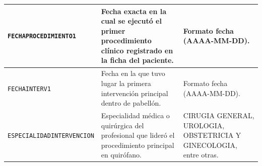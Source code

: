 \begin{table}[htbp]
\begin{tabular}{|l|l|l|}
\parbox[t]{3.8cm}{\texttt{FECHAPROCEDIMIENTO1}} & \parbox[t]{5.4cm}{Fecha exacta en la cual se ejecutó el primer procedimiento clínico registrado en la ficha del paciente.} & \parbox[t]{3.8cm}{Formato fecha (AAAA-MM-DD).} \\ \hline
\parbox[t]{3.8cm}{\texttt{FECHAINTERV1}} & \parbox[t]{5.4cm}{Fecha en la que tuvo lugar la primera intervención principal dentro de pabellón.} & \parbox[t]{3.8cm}{Formato fecha (AAAA-MM-DD).} \\ \hline
\parbox[t]{3.8cm}{\texttt{ESPECIALIDADINTERVENCION}} & \parbox[t]{5.4cm}{Especialidad médica o quirúrgica del profesional que lideró el procedimiento principal en quirófano.} & \parbox[t]{3.8cm}{CIRUGIA GENERAL, UROLOGIA, OBSTETRICIA Y GINECOLOGIA, entre otras.} \\ \hline
\end{tabular}
\end{table}

